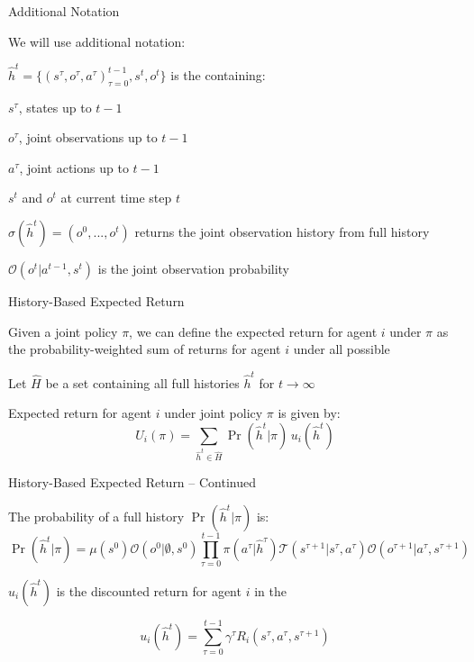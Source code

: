 \begin{frame}{Additional Notation}

    We will use additional notation: 

    \blist
        \item \(\hat{h}^t = \{(s^{\tau}, o^{\tau}, a^{\tau})_{\tau = 0}^{t-1}, s^t, o^t\}\) is the  containing:\\[3pt]
        \blist
            \item \(s^\tau\), states up to \(t-1\)
            \item \(o^\tau\), joint observations up to \(t-1\)
            \item  \(a^{\tau}\), joint actions up to \(t-1\)
            \item \(s^t\) and \(o^t\) at current time step \(t\)
        \elist
        \item \(\sigma(\hat{h}^t) = (o^0, ..., o^t)\) returns the joint observation history from full history
        \item \(\mathcal{O}(o^t|a^{t-1}, s^t)\) is the joint observation probability
    \elist
    
\end{frame}

\begin{frame}{History-Based Expected Return}

    Given a joint policy \(\pi\), we can define the expected return for agent \(i\) under \(\pi\) as the probability-weighted sum of returns for agent \(i\) under all possible 
    \vspace{5pt}
    \blist
        \item Let $\hat{H}$ be a set containing all full histories $\hat{h}^t$ for $t \to \infty$
        \item Expected return for agent $i$ under joint policy \(\pi\) is given by:
    		$$ U_i(\pi) = \sum_{\hat{h}^t \in \hat{H}} \Pr(\hat{h}^t|\pi) \, u_i(\hat{h}^t) $$
    \elist

\end{frame}

\begin{frame}{History-Based Expected Return -- Continued}

    The probability of a full history $\Pr(\hat{h}^t|\pi)$ is:
    \vspace{2pt}
    \[
        \Pr(\hat{h}^t | \pi) = \mu(s^0)\mathcal{O}(o^0 | \emptyset, s^0) \prod_{\tau=0}^{t-1} \pi(a^\tau | \hat{h}^\tau)\mathcal{T}(s^{\tau+1} | s^\tau, a^\tau)\mathcal{O}(o^{\tau+1} | a^\tau, s^{\tau+1})
    \]

    \(u_i(\hat{h}^t)\) is the discounted return for agent \(i\) in the 

    \[
        u_i(\hat{h}^t) = \sum_{\tau=0}^{t-1} \gamma^\tau R_i(s^\tau, a^\tau, s^{\tau+1})
    \]
    
\end{frame}

